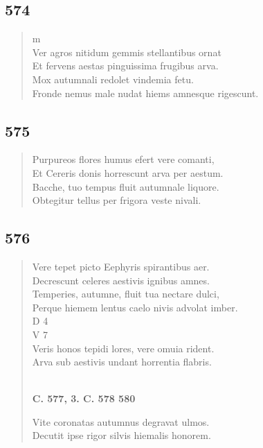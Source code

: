 \documentclass[11pt, a4paper]{report}
\begin{document}
            \subsection*{574}
      \begin{verse}
      m \\ Ver agros nitidum gemmis stellantibus ornat \\ Et fervens aestas pinguissima frugibus arva. \\ Mox autumnali redolet vindemia fetu. \\ Fronde nemus male nudat hiems amnesque rigescunt. \\ 
      \end{verse}
  
            \subsection*{575}
      \begin{verse}
      Purpureos flores humus efert vere comanti, \\ Et Cereris donis horrescunt arva per aestum. \\ Bacche, tuo tempus fluit autumnale liquore. \\ Obtegitur tellus per frigora veste nivali. \\ 
      \end{verse}
  
            \subsection*{576}
      \begin{verse}
      Vere tepet picto Eephyris spirantibus aer. \\ Decrescunt celeres aestivis ignibus amnes. \\ Temperies, autumne, fluit tua nectare dulci, \\ Perque hiemem lentus caelo nivis advolat imber. \\ D 4 \\ V 7 \\ Veris honos tepidi lores, vere omuia rident. \\ Arva sub aestivis undant horrentia flabris. \\ 
        ﻿\pagebreak 
    \begin{center} \textbf{C. 577, 3. C. 578 580} \end{center} \marginpar{[79]} Vite coronatas autumnus degravat ulmos. \\ Decutit ipse rigor silvis hiemalis honorem. \\ 
      \end{verse}
  
\end{document}
